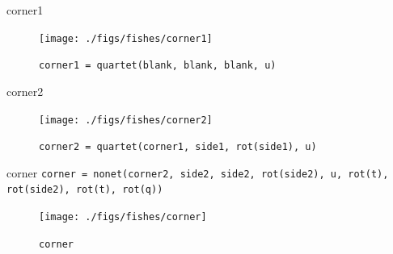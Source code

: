 \documentclass{beamer}
\begin{document}
    \begin{frame}{corner1}

        \begin{figure}
            \centering
            \texttt{[image: ./figs/fishes/corner1]}
            \caption{\texttt{corner1 = quartet(blank, blank, blank, u)}\label{fig:corner1}}
        \end{figure}

    \end{frame}

    \begin{frame}{corner2}

        \begin{figure}
            \centering
            \texttt{[image: ./figs/fishes/corner2]}
            \caption{\footnotesize \texttt{corner2 = quartet(corner1, side1, rot(side1), u)}\label{fig:corner2}}
        \end{figure}

    \end{frame}

%
%
%
%
%

    \begin{frame}{corner}
      \texttt{\scriptsize corner = nonet(corner2, side2, side2, rot(side2), u, rot(t), rot(side2), rot(t), rot(q))}

        \begin{figure}
            \centering
            \texttt{[image: ./figs/fishes/corner]}
            \caption{\texttt{corner}\label{fig:corner}}
        \end{figure}

    \end{frame}
\end{document}
